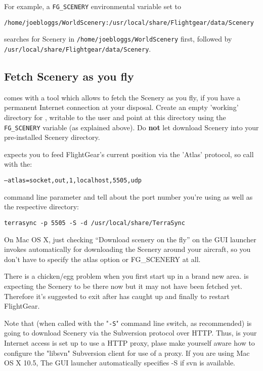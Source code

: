 For example, a \texttt{FG\_SCENERY} environmental variable set to

\noindent
\texttt{/home/joebloggs/WorldScenery:/usr/local/share/Flightgear/data/Scenery}

\noindent
searches for Scenery in
\noindent
\texttt{/home/joebloggs/WorldScenery}
first, followed by
\noindent
\texttt{/usr/local/share/Flightgear/data/Scenery}.

\subsection{Fetch Scenery as you fly}

\FlightGear{} comes with a tool \TerraSync{} which
allows to fetch the Scenery as you fly, if you have a permanent
Internet connection at your disposal. Create an empty 'working'
directory for \TerraSync{}, writable to the user and point
\FlightGear{} at this directory using the \texttt{FG\_SCENERY} variable
(as explained above). Do \textbf{not} let \TerraSync{} download Scenery
into your pre-installed Scenery directory.

\TerraSync{} expects you to feed FlightGear's current position via the
'Atlas' protocol, so call \FlightGear{} with the:

\texttt{--atlas=socket,out,1,localhost,5505,udp}

command line parameter and tell \TerraSync{} about the port number you're
using as well as the respective directory:

\texttt{terrasync -p 5505 -S -d /usr/local/share/TerraSync}
\medskip

On Mac OS X, just checking ``Download scenery on the fly'' on the GUI
launcher invokes \TerraSync{} automatically for downloading the Scenery
around your aircraft, so you don't have to specify the atlas option or 
FG\_SCENERY at all. 

There is a chicken/egg problem when you first start up in a brand new
area.  \FlightGear{} is expecting the Scenery to be there now but it may
not have been fetched yet. Therefore it's suggested to exit \FlightGear{}
after \TerraSync{} has caught up and finally to restart FlightGear.

Note that \TerraSync{} (when called with the "\texttt{-S}" command line
switch, as recommended) is going to download Scenery via the Subversion
protocol over HTTP. Thus, is your Internet access is set up to use a
HTTP proxy, plase make yourself aware how to configure the "libsvn"
Subversion client for use of a proxy. If you are using Mac OS X 10.5,
The GUI launcher automatically specifies -S if svn is available.
\medskip

